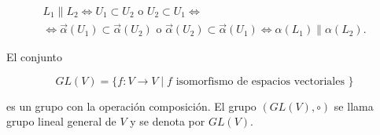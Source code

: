 \documentclass[12pt, a4paper, ones, notitlepage, openany,titlepage]{article}
\begin{document}
\begin{enumerate}[label=(\arabic*)]
\begin{enumerate}[label=(\alph*)]
		\begin{gather*}
			L_{1} \| L_{2} \Longleftrightarrow U_{1} \subset U_{2} \text { o } U_{2} \subset U_{1} \Longleftrightarrow \\
			\Longleftrightarrow \vec{\alpha}\left(U_{1}\right) \subset \vec{\alpha}\left(U_{2}\right) \text { o } \vec{\alpha}\left(U_{2}\right) \subset \vec{\alpha}\left(U_{1}\right) \Longleftrightarrow \alpha\left(L_{1}\right) \| \alpha\left(L_{2}\right) .
		\end{gather*}
		
		El conjunto
		
		$$
		G L(V)=\{f: V \rightarrow V \mid f \text { isomorfismo de espacios vectoriales }\}
		$$
		
		es un grupo con la operación composición. El grupo $(G L(V), \circ)$ se llama grupo lineal general de $V$ y se denota por $G L(V)$.
		
	\end{enumerate}
\end{enumerate}
\end{document}
